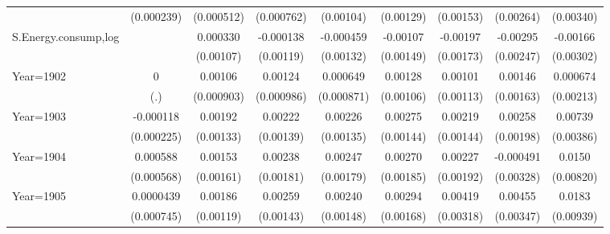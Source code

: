\begin{table}[htbp]
\begin{tabular}{l*{8}{c}}
                    &  (0.000239)         &  (0.000512)         &  (0.000762)         &   (0.00104)         &   (0.00129)         &   (0.00153)         &   (0.00264)         &   (0.00340)         \\
[1em]
S.Energy.consump,log&                     &    0.000330         &   -0.000138         &   -0.000459         &    -0.00107         &    -0.00197         &    -0.00295         &    -0.00166         \\
                    &                     &   (0.00107)         &   (0.00119)         &   (0.00132)         &   (0.00149)         &   (0.00173)         &   (0.00247)         &   (0.00302)         \\
[1em]
Year=1902           &           0         &     0.00106         &     0.00124         &    0.000649         &     0.00128         &     0.00101         &     0.00146         &    0.000674         \\
                    &         (.)         &  (0.000903)         &  (0.000986)         &  (0.000871)         &   (0.00106)         &   (0.00113)         &   (0.00163)         &   (0.00213)         \\
[1em]
Year=1903           &   -0.000118         &     0.00192         &     0.00222         &     0.00226\sym{*}  &     0.00275\sym{*}  &     0.00219         &     0.00258         &     0.00739\sym{*}  \\
                    &  (0.000225)         &   (0.00133)         &   (0.00139)         &   (0.00135)         &   (0.00144)         &   (0.00144)         &   (0.00198)         &   (0.00386)         \\
[1em]
Year=1904           &    0.000588         &     0.00153         &     0.00238         &     0.00247         &     0.00270         &     0.00227         &   -0.000491         &      0.0150\sym{*}  \\
                    &  (0.000568)         &   (0.00161)         &   (0.00181)         &   (0.00179)         &   (0.00185)         &   (0.00192)         &   (0.00328)         &   (0.00820)         \\
[1em]
Year=1905           &   0.0000439         &     0.00186         &     0.00259\sym{*}  &     0.00240         &     0.00294\sym{*}  &     0.00419         &     0.00455         &      0.0183\sym{*}  \\
                    &  (0.000745)         &   (0.00119)         &   (0.00143)         &   (0.00148)         &   (0.00168)         &   (0.00318)         &   (0.00347)         &   (0.00939)         \\

\end{tabular}
\end{table}
